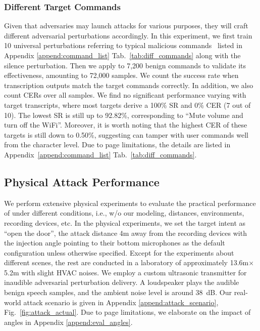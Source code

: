 \subsubsection{Different Target Commands}\label{sec:eval_commands}
Given that adversaries may launch attacks for various purposes, they will craft different adversarial perturbations accordingly.
In this experiment, we first train 10 universal perturbations referring to typical malicious commands~\cite{petracca2015audroid} listed in Appendix \textsection\ref{append:command_list} Tab.~\ref{tab:diff_commands} along with the silence perturbation. Then we apply \alias to 7,200 benign commands to validate its effectiveness, amounting to 72,000 samples. 
We count the success rate when transcription outputs match the target commands correctly. In addition, we also count CERs over all samples. We find no significant performance varying with target transcripts, where most targets derive a 100\% SR and 0\% CER (7 out of 10). The lowest SR is still up to 92.82\%, corresponding to ``Mute volume and turn off the WiFi''. Moreover, it is worth noting that the highest CER of these targets is still down to 0.50\%, suggesting \alias can tamper with user commands well from the character level. Due to page limitations, the details are listed in Appendix~\ref{append:command_list} Tab.~\ref{tab:diff_commands}.

\subsection{Physical Attack Performance}
We perform extensive physical experiments to evaluate the practical performance of \alias under different conditions, i.e., w/o our modeling, distances, environments, recording devices, etc.
In the physical experiments, %
we set the target intent as ``open the door'', the attack distance 4m away from the recording devices with the injection angle pointing to their bottom microphones as the default configuration unless otherwise specified. Except for the experiments about different scenes, the rest are conducted in a laboratory of approximately 13.6m$\times$5.2m with slight HVAC noises. We employ a custom ultrasonic transmitter for inaudible adversarial perturbation delivery. A loudspeaker plays the audible benign speech samples, and the ambient noise level is around 38~dB. 
Our real-world attack scenario is given in Appendix \textsection\ref{append:attack_scenario}, Fig.~\ref{fig:attack_actual}. 
Due to page limitations, we elaborate on the impact of angles in Appendix \textsection\ref{append:eval_angles}.

